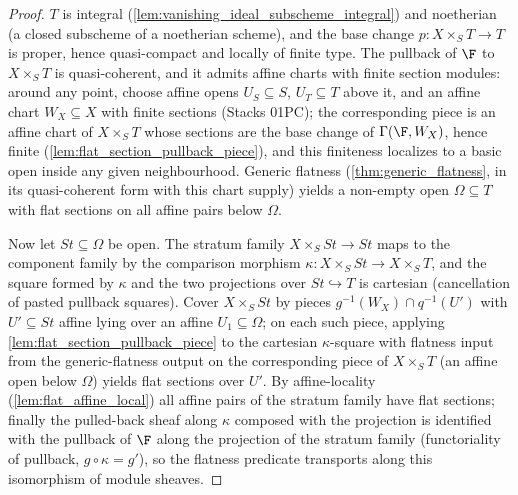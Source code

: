 \begin{proof}
  \leanok
  \(T\) is integral (\cref{lem:vanishing_ideal_subscheme_integral}) and
  noetherian (a closed subscheme of a noetherian scheme), and the base
  change \(p : X \times_S T \to T\) is proper, hence quasi-compact and
  locally of finite type.  The pullback of \(\F\) to \(X \times_S T\) is
  quasi-coherent, and it admits affine charts with finite section modules:
  around any point, choose affine opens \(U_S \subseteq S\),
  \(U_T \subseteq T\) above it, and an affine chart \(W_X \subseteq X\)
  with finite sections (Stacks 01PC); the corresponding piece is an affine
  chart of \(X \times_S T\) whose sections are the base change of
  \(\Gamma(\F, W_X)\), hence finite (\cref{lem:flat_section_pullback_piece}),
  and this finiteness localizes to a basic open inside any given
  neighbourhood.  Generic flatness (\cref{thm:generic_flatness}, in its
  quasi-coherent form with this chart supply) yields a non-empty open
  \(\Omega \subseteq T\) with flat sections on all affine pairs below
  \(\Omega\).

  Now let \(\mathit{St} \subseteq \Omega\) be open.  The stratum family
  \(X \times_S \mathit{St} \to \mathit{St}\) maps to the component family by
  the comparison morphism
  \(\kappa : X \times_S \mathit{St} \to X \times_S T\), and the square
  formed by \(\kappa\) and the two projections over
  \(\mathit{St} \hookrightarrow T\) is cartesian (cancellation of pasted
  pullback squares).  Cover \(X \times_S \mathit{St}\) by pieces
  \(g^{-1}(W_X) \cap q^{-1}(U')\) with \(U' \subseteq \mathit{St}\) affine
  lying over an affine \(U_1 \subseteq \Omega\); on each such piece,
  applying \cref{lem:flat_section_pullback_piece} to the cartesian
  \(\kappa\)-square with flatness input from the generic-flatness output on
  the corresponding piece of \(X \times_S T\) (an affine open below
  \(\Omega\)) yields flat sections over \(U'\).  By affine-locality
  (\cref{lem:flat_affine_local}) all affine pairs of the stratum family
  have flat sections; finally the pulled-back sheaf along \(\kappa\)
  composed with the projection is identified with the pullback of \(\F\)
  along the projection of the stratum family (functoriality of pullback,
  \(g \circ \kappa = g'\)), so the flatness predicate transports along this
  isomorphism of module sheaves.
\end{proof}

